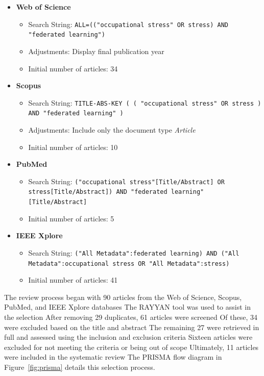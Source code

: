 \documentclass[12pt]{article}
\begin{document}
\begin{itemize}
    \item
    \textbf{Web of Science}
    \begin{itemize}
        \item
Search String: \texttt{ALL=(("occupational stress" OR stress) AND "federated learning")}
        \item
        Adjustments: Display final publication year
        \item
        Initial number of articles: 34
    \end{itemize}
    \item
    \textbf{Scopus}
    \begin{itemize}
        \item
Search String: \texttt{TITLE-ABS-KEY ( ( "occupational stress" OR stress ) AND "federated learning" )}
        \item
        Adjustments: Include only the document type \textit{Article}
        \item
        Initial number of articles: 10
    \end{itemize}
    \item
    \textbf{PubMed}
    \begin{itemize}
        \item
Search String: \texttt{("occupational stress"[Title/Abstract] OR stress[Title/Abstract]) AND "federated learning"[Title/Abstract]}
        \item
        Initial number of articles: 5
    \end{itemize}
    \item
    \textbf{IEEE Xplore}
    \begin{itemize}
        \item
Search String: \texttt{("All Metadata":federated learning) AND ("All Metadata":occupational stress OR "All Metadata":stress)}
        \item
        Initial number of articles: 41
    \end{itemize}
\end{itemize}

The review process began with 90 articles from the Web of Science, Scopus, PubMed, and IEEE Xplore databases The RAYYAN tool was used to assist in the selection \cite{nastasha_johnson_93d644ed} After removing 29 duplicates, 61 articles were screened Of these, 34 were excluded based on the title and abstract The remaining 27 were retrieved in full and assessed using the inclusion and exclusion criteria Sixteen articles were excluded for not meeting the criteria or being out of scope Ultimately, 11 articles were included in the systematic review The PRISMA flow diagram in Figure~\ref{fig:prisma} details this selection process.
\end{document}
